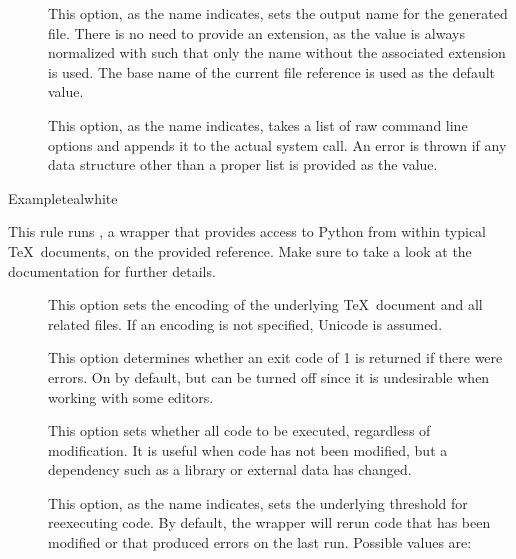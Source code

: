 \begin{description}
\begin{description}
\item[] This option, as the name indicates, sets the output name for the generated  file. There is no need to provide an extension, as the value is always normalized with  such that only the name without the associated extension is used. The base name of the current file reference is used as the default value.

\item[] This option, as the name indicates, takes a list of raw command line options and appends it to the actual system call. An error is thrown if any data structure other than a proper list is provided as the value.
\end{description}

\begin{codebox}{Example}{teal}{\icnote}{white}
\end{codebox}

\item[\rulebox{pythontex}]
This rule runs , a wrapper that provides access to Python from within typical \TeX\ documents, on the provided  reference. Make sure to take a look at the documentation for further details.

\begin{description}
\item[] This option sets the encoding of the underlying \TeX\ document and all related files. If an encoding is not specified, Unicode is assumed.

\item[] This option determines whether an exit code of 1 is returned if there were errors. On by default, but can be turned off since it is undesirable when working with some editors.

\item[] This option sets whether all code to be executed, regardless of modification. It is useful when code has not been modified, but a dependency such as a library or external data has changed.

\item[] This option, as the name indicates, sets the underlying threshold for reexecuting code. By default, the wrapper will rerun code that has been modified or that produced errors  on the last run. Possible values are:


\end{description}
\end{description}
